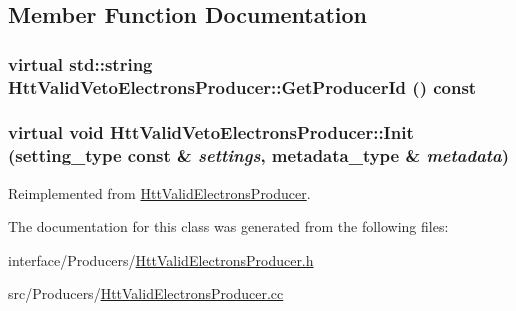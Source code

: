 \subsection{Member Function Documentation}
\hypertarget{classHttValidVetoElectronsProducer_a5ac4a1b91978488bbf96d66445f641d7}{
\subsubsection[{GetProducerId}]{\setlength{\rightskip}{0pt plus 5cm}virtual std::string HttValidVetoElectronsProducer::GetProducerId () const}}
\label{classHttValidVetoElectronsProducer_a5ac4a1b91978488bbf96d66445f641d7}
\hypertarget{classHttValidVetoElectronsProducer_acba0b3d8e9aad0dda1c8f438b51cc262}{
\subsubsection[{Init}]{\setlength{\rightskip}{0pt plus 5cm}virtual void HttValidVetoElectronsProducer::Init (setting\_\-type const \& {\em settings}, \/  metadata\_\-type \& {\em metadata})}}
\label{classHttValidVetoElectronsProducer_acba0b3d8e9aad0dda1c8f438b51cc262}


Reimplemented from \hyperlink{classHttValidElectronsProducer_ae10e80f0e540bbf1d1e85a141b530bd7}{HttValidElectronsProducer}.

The documentation for this class was generated from the following files:\begin{DoxyCompactItemize}
\item 
interface/Producers/\hyperlink{HttValidElectronsProducer_8h}{HttValidElectronsProducer.h}\item 
src/Producers/\hyperlink{HttValidElectronsProducer_8cc}{HttValidElectronsProducer.cc}\end{DoxyCompactItemize}
